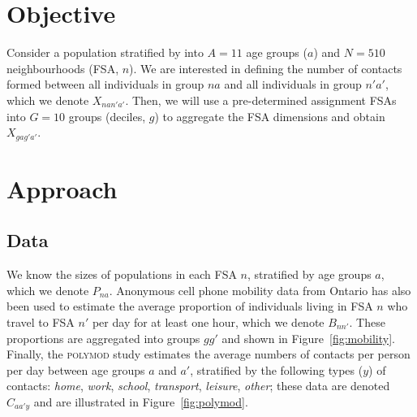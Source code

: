 \documentclass{article}
\begin{document}
  \maketitle
  \section{Objective}\label{s:obj}
  Consider a population stratified by into
  $A=11$ age groups ($a$) and $N=510$ neighbourhoods (FSA, $n$).
  We are interested in defining the number of contacts formed between
  all individuals in group $na$ and all individuals in group $n'a'$,
  which we denote $X_{nan'a'}$.
  Then, we will use a pre-determined assignment FSAs into $G=10$ groups (deciles, $g$)
  to aggregate the FSA dimensions and obtain $X_{gag'a'}$.
  \section{Approach}\label{s:methods}
  \subsection{Data}\label{ss:data}
  We know the sizes of populations in each FSA $n$, stratified by age groups $a$,
  which we denote $P_{na}$.
  Anonymous cell phone mobility data from Ontario has also been used to estimate
  the average proportion of individuals living in FSA $n$ who travel to FSA $n'$ per day
  for at least one hour, which we denote $B_{nn'}$.
  These proportions are aggregated into groups $gg'$ and shown in Figure~\ref{fig:mobility}.
  Finally, the \textsc{polymod} study estimates the average numbers of contacts per person per day
  between age groups $a$ and $a'$, stratified by the following types ($y$) of contacts:
  \emph{home}, \emph{work}, \emph{school}, \emph{transport}, \emph{leisure}, \emph{other};
  these data are denoted $C_{aa'y}$ and are illustrated in Figure~\ref{fig:polymod}.
\end{document}
